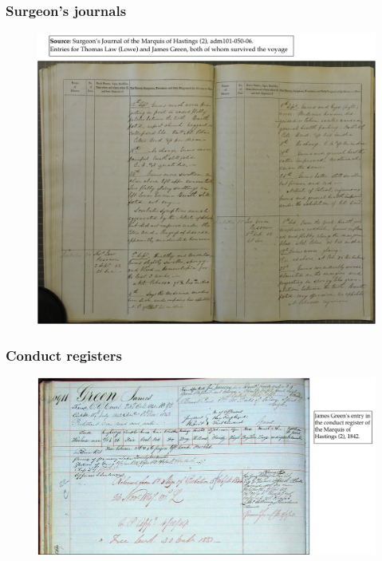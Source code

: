 \documentclass[ignorenonframetext,11pt]{beamer}
\begin{document}
\begin{frame}
\frametitle{Surgeon's journals}
\label{surgeonsjournals}

\begin{figure}
	\label{marquisofhastingsjournal}
	\begin{center}
	\includegraphics[keepaspectratio,width=\textwidth, height=.75\textheight]{images/journal.png}
	\end{center}
	\end{figure}
	



\end{frame}
		

\begin{frame}
\frametitle{Conduct registers}
\label{conductregisters}

\begin{figure}
	\label{marquisofhastingsconductrecord}
	\begin{center}
	\includegraphics[keepaspectratio,width=\textwidth, height=.75\textheight]{images/conduct.png}
	\end{center}
	\end{figure}
	



\end{frame}
		
\end{document}
